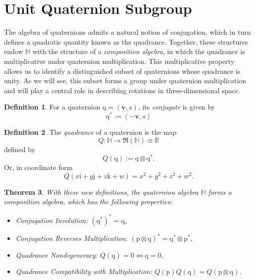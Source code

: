 \documentclass{amsart}
\newtheorem{theorem}{Theorem}[section]
\theoremstyle{definition}
\newtheorem{definition}[theorem]{Definition}
\theoremstyle{remark}
\numberwithin{equation}{section}
\begin{document}
\section{Unit Quaternion Subgroup}
The algebra of quaternions admits a natural notion of conjugation, which in turn defines a quadratic quantity known as the quadrance.
Together, these structures endow $\mathbb{H}$ with the structure of a \emph{composition algebra}, in which the quadrance is multiplicative under quaternion multiplication.
This multiplicative property allows us to identify a distinguished subset of quaternions whose quadrance is unity.
As we will see, this subset forms a group under quaternion multiplication and will play a central role in describing rotations in three-dimensional space.

\begin{definition}
  For a quaternion $\mathrm{q}=(\mathbf{v}, s)$, its \emph{conjugate} is given by
  \begin{equation}
    \mathrm{q}^* := (-\mathbf{v}, s)
  \end{equation}
\end{definition}

\begin{definition}
  The \emph{quadrance} of a quaternion is the map
  \begin{equation}
    Q: \mathbb{H} \to \Re(\mathbb{H}) \cong \mathbb{R}
  \end{equation}
  defined by
  \begin{equation}
    Q(\mathrm{q}) := \mathrm{q} \otimes \mathrm{q}^*.
  \end{equation}
  Or, in coordinate form
  \begin{equation}
    Q(x\mathrm{i}+y\mathrm{j}+z\mathrm{k}+w) = x^2 + y^2 + z^2 + w^2.
  \end{equation}
\end{definition}

\begin{theorem}
  With these new definitions, the quaternion algebra $\mathbb{H}$ forms a composition algebra, which has the following properties:
  \begin{itemize}
    \item Conjugation Involution: $\left(\mathrm{q}^*\right)^* = \mathrm{q}$,
    \item Conjugation Reverses Multiplication: $(\mathrm{p}\otimes\mathrm{q})^*=\mathrm{q}^*\otimes\mathrm{p}^*$,
    \item Quadrance Nondegeneracy: $Q(\mathrm{q})=0 \Leftrightarrow \mathrm{q} = \mathrm{0}$,
    \item Quadrance Compatibility with Multiplication: $Q(\mathrm{p})Q(\mathrm{q})=Q(\mathrm{p}\otimes \mathrm{q})$.
  \end{itemize}
\end{theorem}
\end{document}
